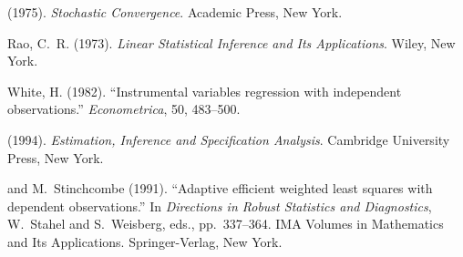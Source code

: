 \begin{description}
\item[\textemdash\textemdash\textemdash] (1975). \textit{Stochastic Convergence}. Academic Press, New York.

\item Rao, C.~R. (1973). \textit{Linear Statistical Inference and Its Applications}. Wiley, New York.

\item White, H. (1982). ``Instrumental variables regression with independent observations.'' \textit{Econometrica}, 50, 483--500.

\item[\textemdash\textemdash\textemdash] (1994). \textit{Estimation, Inference and Specification Analysis}. Cambridge University Press, New York.

\item[\textemdash\textemdash\textemdash] and M.~Stinchcombe (1991). ``Adaptive efficient weighted least squares with dependent observations.'' In \textit{Directions in Robust Statistics and Diagnostics}, W.~Stahel and S.~Weisberg, eds., pp.~337--364. IMA Volumes in Mathematics and Its Applications. Springer-Verlag, New York.
\end{description}
